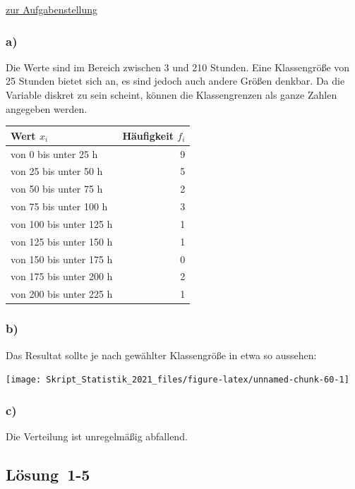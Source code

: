 \documentclass[
  11pt,
  ngerman,
  a4paper,
]{report}
\begin{document}
\protect\hyperlink{aufgabe-1-4}{zur Aufgabenstellung}

\hypertarget{a-1}{%
\subsubsection{a)}\label{a-1}}

Die Werte sind im Bereich zwischen 3 und 210 Stunden. Eine Klassengröße von 25 Stunden bietet sich an, es sind jedoch auch andere Größen denkbar. Da die Variable diskret zu sein scheint, können die Klassengrenzen als ganze Zahlen angegeben werden.

\begin{table}[H]
\centering
\begin{tabular}{lr}
\toprule
\textbf{Wert $x_i$} & \textbf{Häufigkeit $f_i$}\\
\midrule
von 0 bis unter 25 h & 9\\
von 25 bis unter 50 h & 5\\
von 50 bis unter 75 h & 2\\
von 75 bis unter 100 h & 3\\
von 100 bis unter 125 h & 1\\
von 125 bis unter 150 h & 1\\
von 150 bis unter 175 h & 0\\
von 175 bis unter 200 h & 2\\
von 200 bis unter 225 h & 1\\
\bottomrule
\end{tabular}
\end{table}

\hypertarget{b-1}{%
\subsubsection{b)}\label{b-1}}

Das Resultat sollte je nach gewählter Klassengröße in etwa so aussehen:

\begin{center}\texttt{[image: Skript\_Statistik\_2021\_files/figure-latex/unnamed-chunk-60-1]} \end{center}

\hypertarget{c-1}{%
\subsubsection{c)}\label{c-1}}

Die Verteilung ist unregelmäßig abfallend.

\hypertarget{loesung-1-5}{%
\subsection{Lösung~1-5}\label{loesung-1-5}}
\end{document}
